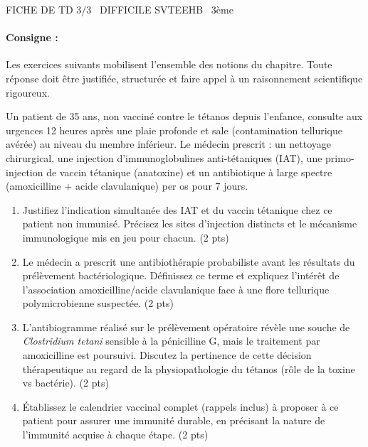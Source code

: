 \documentclass[11pt]{article}
\begin{document}
\begin{tcolorbox}[enhanced,colback=popink,colframe=popink,arc=10pt,boxrule=0pt,left=12pt,right=12pt,top=9pt,bottom=9pt]
{\color{white}\popxbold\small FICHE DE TD 3/3 \textbullet\ DIFFICILE \hfill SVTEEHB \textbullet\ 3ème\par}
\end{tcolorbox}
\vspace{4pt}
\paragraph{Consigne :} Les exercices suivants mobilisent l'ensemble des notions du chapitre. Toute réponse doit être justifiée, structurée et faire appel à un raisonnement scientifique rigoureux.

\begin{exercice}
Un patient de 35 ans, non vacciné contre le tétanos depuis l'enfance, consulte aux urgences 12 heures après une plaie profonde et sale (contamination tellurique avérée) au niveau du membre inférieur. Le médecin prescrit : un nettoyage chirurgical, une injection d'immunoglobulines anti-tétaniques (IAT), une primo-injection de vaccin tétanique (anatoxine) et un antibiotique à large spectre (amoxicilline + acide clavulanique) per os pour 7 jours.
\begin{enumerate}
    \item Justifiez l'indication simultanée des IAT et du vaccin tétanique chez ce patient non immunisé. Précisez les sites d'injection distincts et le mécanisme immunologique mis en jeu pour chacun. (2 pts)
    \item Le médecin a prescrit une antibiothérapie probabiliste avant les résultats du prélèvement bactériologique. Définissez ce terme et expliquez l'intérêt de l'association amoxicilline/acide clavulanique face à une flore tellurique polymicrobienne suspectée. (2 pts)
    \item L'antibiogramme réalisé sur le prélèvement opératoire révèle une souche de \textit{Clostridium tetani} sensible à la pénicilline G, mais le traitement par amoxicilline est poursuivi. Discutez la pertinence de cette décision thérapeutique au regard de la physiopathologie du tétanos (rôle de la toxine vs bactérie). (2 pts)
    \item Établissez le calendrier vaccinal complet (rappels inclus) à proposer à ce patient pour assurer une immunité durable, en précisant la nature de l'immunité acquise à chaque étape. (2 pts)
\end{enumerate}
\end{exercice}
\end{document}
